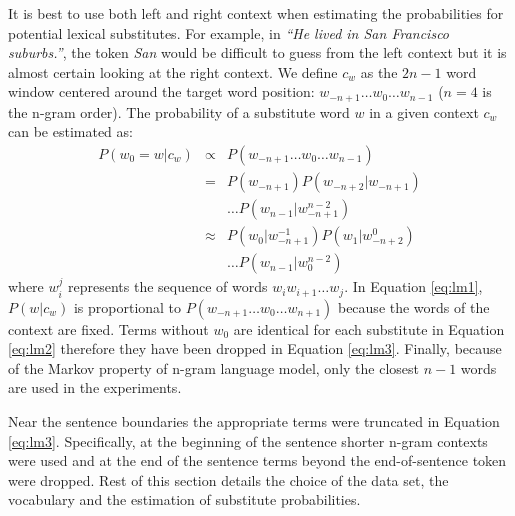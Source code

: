 It is best to use both left and right context when estimating the
probabilities for potential lexical substitutes.  For example, in
\emph{``He lived in San Francisco suburbs.''}, the token \emph{San}
would be difficult to guess from the left context but it is almost
certain looking at the right context.  We define $c_w$ as the $2n-1$
word window centered around the target word position: $w_{-n+1} \ldots
w_0 \ldots w_{n-1}$ ($n=4$ is the n-gram order).  The probability of a
substitute word $w$ in a given context $c_w$ can be estimated as:
\begin{eqnarray}
  \label{eq:lm1}P(w_0 = w | c_w) & \propto & P(w_{-n+1}\ldots w_0\ldots w_{n-1})\\
  \label{eq:lm2}& = & P(w_{-n+1})P(w_{-n+2}|w_{-n+1})\nonumber\\
  &&\ldots P(w_{n-1}|w_{-n+1}^{n-2})\\
  \label{eq:lm3}& \approx & P(w_0| w_{-n+1}^{-1})P(w_{1}|w_{-n+2}^0)\nonumber\\
  &&\ldots P(w_{n-1}|w_0^{n-2})
\end{eqnarray}
where $w_i^j$ represents the sequence of words $w_i w_{i+1} \ldots
w_{j}$.  In Equation \ref{eq:lm1}, $P(w|c_w)$ is proportional to
$P(w_{-n+1}\ldots w_0 \ldots w_{n+1})$ because the words of the
context are fixed.  Terms without $w_0$ are identical for each
substitute in Equation \ref{eq:lm2} therefore they have been dropped
in Equation \ref{eq:lm3}.  Finally, because of the Markov property of
n-gram language model, only the closest $n-1$ words are used in the
experiments.

Near the sentence boundaries the appropriate terms were truncated in
Equation \ref{eq:lm3}.  Specifically, at the beginning of the sentence
shorter n-gram contexts were used and at the end of the sentence terms
beyond the end-of-sentence token were dropped.  Rest of this section
details the choice of the data set, the vocabulary and the estimation
of substitute probabilities.


